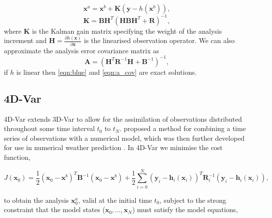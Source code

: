 \documentclass[12pt]{article}
\begin{document}
\begin{equation}
\textbf{x}^{a} = \textbf{x}^{b} + \textbf{K}(\textbf{y} - h(\textbf{x}^{b})), \label{eqn:blue}
\end{equation}
\begin{equation}
\textbf{K} = \textbf{B}\textbf{H}^{T}(\textbf{H}\textbf{B}\textbf{H}^{T}+\textbf{R})^{-1},
\end{equation}
where \textbf{K} is the Kalman gain matrix specifying the weight of the analysis increment and \(\textbf{H}=\frac{\partial h(\textbf{x})}{\partial \textbf{x}}\) is the linearised observation operator. We can also approximate the analysis error covariance matrix as
\begin{equation}
\textbf{A} = (\textbf{H}^{T}\textbf{R}^{-1}\textbf{H}+\textbf{B}^{-1})^{-1}, \label{eqn:a_cov}
\end{equation}
if \( h \) is linear then \eqref{eqn:blue} and \eqref{eqn:a_cov} are exact solutions.


\subsection{4D-Var}

4D-Var extends 3D-Var to allow for the assimilation of observations distributed throughout some time interval \(t_{0}\) to \(t_{N}\). \citet{Sasaki70somebasic} proposed a method for combining a time series of observations with a numerical model, which was then further developed for use in numerical weather prediction \citep{dimet1986variational}. In 4D-Var we minimise the cost function,

\begin{equation}
J(\textbf{x}_0) = \frac{1}{2}(\textbf{x}_0-\textbf{x}^b)^{T}\textbf{B}^{-1}(\textbf{x}_0-\textbf{x}^b)+\frac{1}{2}\sum_{i=0}^{N}(\textbf{y}_i-\textbf{h}_i(\textbf{x}_i))^{T}\textbf{R}_{i}^{-1}(\textbf{y}_i-\textbf{h}_i(\textbf{x}_i)), \label{eqn:4dvar_cost}
\end{equation}

to obtain the analysis \(\textbf{x}^{a}_{0}\), valid at the initial time \(t_{0}\), subject to the strong constraint that the model states (\(\textbf{x}_0, \dots, \textbf{x}_N\)) must satisfy the model equations,
\end{document}
